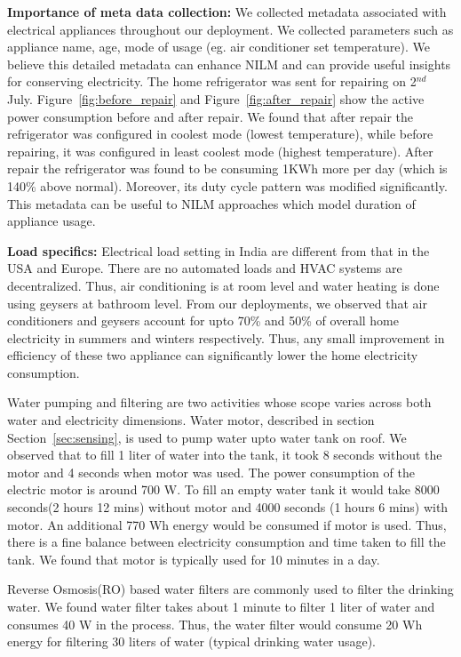 \documentclass[10pt]{sensys-proc}
\newcommand{\figref}[1]{Figure~\ref{#1}}
\newcommand{\secref}[1]{Section~\ref{#1}}
\begin{document}
\noindent \textbf{Importance of meta data collection:} We collected metadata associated with electrical appliances throughout our deployment. We collected parameters such as appliance name, age, mode of usage (eg. air conditioner set temperature). We believe this detailed metadata can enhance NILM and can provide useful insights for conserving electricity. The home refrigerator was sent for repairing on 2$^{nd}$ July. \figref{fig:before_repair} and \figref{fig:after_repair} show the active power consumption before and after repair. We found that after repair the refrigerator was configured in coolest mode (lowest temperature), while before repairing, it was configured in least coolest mode (highest temperature). After repair the refrigerator was found to be consuming 1KWh more per day (which is 140\% above normal). Moreover, its duty cycle pattern was modified significantly. This metadata can be useful to NILM approaches which model duration of appliance usage.

\noindent \textbf{Load specifics:} Electrical load setting in India are different from that in the USA and Europe. There are no automated loads and HVAC systems are decentralized. Thus, air conditioning is at room level and water heating is done using geysers at bathroom level. From our deployments, we observed that air conditioners and geysers account for upto 70\% and 50\% of overall home electricity in summers and winters respectively. Thus, any small improvement in efficiency of these two appliance can significantly lower the home electricity consumption.


\noindent Water pumping and filtering are two activities whose scope varies across both water and electricity dimensions. Water motor, described in section \secref{sec:sensing}, is used to pump water upto water tank on roof. We observed that to fill 1 liter of water into the tank, it took 8 seconds without the motor and 4 seconds when motor was used. The power consumption of the electric motor is around 700 W. To fill an empty water tank it would take 8000 seconds(2 hours 12 mins) without motor and 4000 seconds (1 hours 6 mins) with motor. An additional 770 Wh energy would be consumed if motor is used. Thus, there is a fine balance between electricity consumption and time taken to fill the tank. We found that motor is typically used for 10 minutes in a day.

\noindent Reverse Osmosis(RO) based water filters are commonly used to filter the drinking water. We found water filter takes about 1 minute to filter 1 liter of water and consumes 40 W in the process. Thus, the water filter would consume 20 Wh energy for filtering 30 liters of water (typical drinking water usage).
\end{document}

